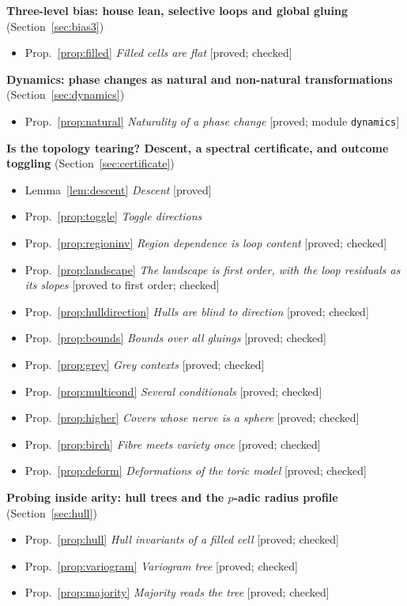 \documentclass[11pt]{article}
\theoremstyle{definition}
\theoremstyle{remark}
\begin{document}
\noindent\textbf{Three-level bias: house lean, selective loops and global gluing} (Section~\ref{sec:bias3})
\begin{itemize}[itemsep=0pt]
  \item Prop.~\ref{prop:filled} \emph{Filled cells are flat} [proved; checked]
\end{itemize}
\noindent\textbf{Dynamics: phase changes as natural and non-natural transformations} (Section~\ref{sec:dynamics})
\begin{itemize}[itemsep=0pt]
  \item Prop.~\ref{prop:natural} \emph{Naturality of a phase change} [proved; module \texttt{dynamics}]
\end{itemize}
\noindent\textbf{Is the topology tearing? Descent, a spectral certificate, and outcome toggling} (Section~\ref{sec:certificate})
\begin{itemize}[itemsep=0pt]
  \item Lemma~\ref{lem:descent} \emph{Descent} [proved]
  \item Prop.~\ref{prop:toggle} \emph{Toggle directions}
  \item Prop.~\ref{prop:regioninv} \emph{Region dependence is loop content} [proved; checked]
  \item Prop.~\ref{prop:landscape} \emph{The landscape is first order, with the loop residuals as its slopes} [proved to first order; checked]
  \item Prop.~\ref{prop:hulldirection} \emph{Hulls are blind to direction} [proved; checked]
  \item Prop.~\ref{prop:bounds} \emph{Bounds over all gluings} [proved; checked]
  \item Prop.~\ref{prop:grey} \emph{Grey contexts} [proved; checked]
  \item Prop.~\ref{prop:multicond} \emph{Several conditionals} [proved; checked]
  \item Prop.~\ref{prop:higher} \emph{Covers whose nerve is a sphere} [proved; checked]
  \item Prop.~\ref{prop:birch} \emph{Fibre meets variety once} [proved; checked]
  \item Prop.~\ref{prop:deform} \emph{Deformations of the toric model} [proved; checked]
\end{itemize}
\noindent\textbf{Probing inside arity: hull trees and the $p$-adic radius profile} (Section~\ref{sec:hull})
\begin{itemize}[itemsep=0pt]
  \item Prop.~\ref{prop:hull} \emph{Hull invariants of a filled cell} [proved; checked]
  \item Prop.~\ref{prop:variogram} \emph{Variogram tree} [proved; checked]
  \item Prop.~\ref{prop:majority} \emph{Majority reads the tree} [proved; checked]
\end{itemize}
\end{document}
